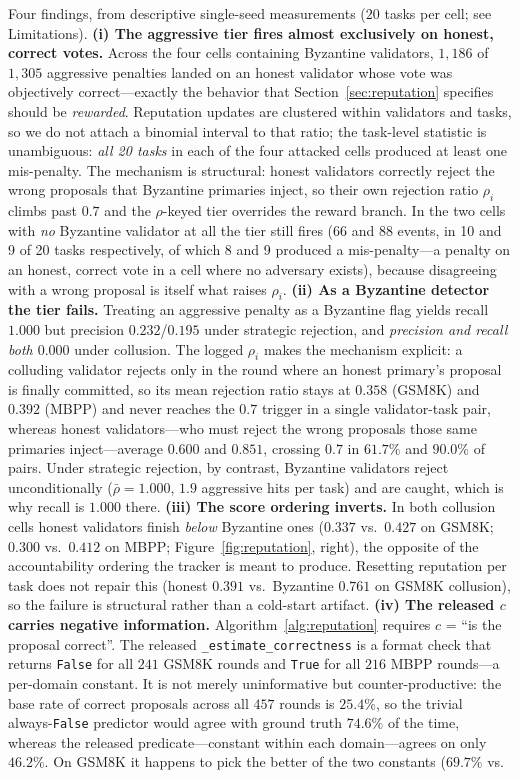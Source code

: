 \documentclass{article}
\begin{document}
Four findings, from descriptive single-seed measurements ($20$ tasks per cell; see Limitations). \textbf{(i) The aggressive tier fires almost exclusively on honest, correct votes.} Across the four cells containing Byzantine validators, $1{,}186$ of $1{,}305$ aggressive penalties landed on an honest validator whose vote was objectively correct---exactly the behavior that Section~\ref{sec:reputation} specifies should be \emph{rewarded}. Reputation updates are clustered within validators and tasks, so we do not attach a binomial interval to that ratio; the task-level statistic is unambiguous: \emph{all 20 tasks} in each of the four attacked cells produced at least one mis-penalty. The mechanism is structural: honest validators correctly reject the wrong proposals that Byzantine primaries inject, so their own rejection ratio $\rho_i$ climbs past $0.7$ and the $\rho$-keyed tier overrides the reward branch. In the two cells with \emph{no} Byzantine validator at all the tier still fires (66 and 88 events, in 10 and 9 of 20 tasks respectively, of which 8 and 9 produced a mis-penalty---a penalty on an honest, correct vote in a cell where no adversary exists), because disagreeing with a wrong proposal is itself what raises $\rho_i$. \textbf{(ii) As a Byzantine detector the tier fails.} Treating an aggressive penalty as a Byzantine flag yields recall $1.000$ but precision $0.232$/$0.195$ under strategic rejection, and \emph{precision and recall both $0.000$} under collusion. The logged $\rho_i$ makes the mechanism explicit: a colluding validator rejects only in the round where an honest primary's proposal is finally committed, so its mean rejection ratio stays at $0.358$ (GSM8K) and $0.392$ (MBPP) and never reaches the $0.7$ trigger in a single validator-task pair, whereas honest validators---who must reject the wrong proposals those same primaries inject---average $0.600$ and $0.851$, crossing $0.7$ in $61.7\%$ and $90.0\%$ of pairs. Under strategic rejection, by contrast, Byzantine validators reject unconditionally ($\bar\rho = 1.000$, $1.9$ aggressive hits per task) and are caught, which is why recall is $1.000$ there. \textbf{(iii) The score ordering inverts.} In both collusion cells honest validators finish \emph{below} Byzantine ones ($0.337$ vs.\ $0.427$ on GSM8K; $0.300$ vs.\ $0.412$ on MBPP; Figure~\ref{fig:reputation}, right), the opposite of the accountability ordering the tracker is meant to produce. Resetting reputation per task does not repair this (honest $0.391$ vs.\ Byzantine $0.761$ on GSM8K collusion), so the failure is structural rather than a cold-start artifact. \textbf{(iv) The released $c$ carries negative information.} Algorithm~\ref{alg:reputation} requires $c$ = ``is the proposal correct''. The released \texttt{\_estimate\_correctness} is a format check that returns \texttt{False} for all $241$ GSM8K rounds and \texttt{True} for all $216$ MBPP rounds---a per-domain constant. It is not merely uninformative but counter-productive: the base rate of correct proposals across all $457$ rounds is $25.4\%$, so the trivial always-\texttt{False} predictor would agree with ground truth $74.6\%$ of the time, whereas the released predicate---constant within each domain---agrees on only $46.2\%$. On GSM8K it happens to pick the better of the two constants ($69.7\%$ vs.\ 
\end{document}
